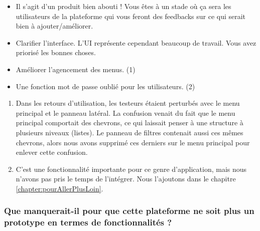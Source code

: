 \begin{itemize}
    \item Il s'agit d'un produit bien abouti ! Vous êtes à un stade où ça sera les utilisateurs de la plateforme qui vous feront des feedbacks sur ce qui serait bien à ajouter/améliorer.
    \item Clarifier l'interface. L'UI représente cependant beaucoup de travail. Vous avez priorisé les bonnes choses.
    \item Améliorer l'agencement des menus. (1)
    \item Une fonction mot de passe oublié pour les utilisateurs. (2)
\end{itemize}
\bigskip
\begin{enumerate}
    \item Dans les retours d'utilisation, les testeurs étaient perturbés avec le menu principal et le panneau latéral. La confusion venait du fait que le menu principal comportait des chevrons, ce qui laissait penser à une structure à plusieurs niveaux (listes). Le panneau de filtres contenait aussi ces mêmes chevrons, alors nous avons supprimé ces derniers sur le menu principal pour enlever cette confusion.
    \item C'est une fonctionnalité importante pour ce genre d'application, mais nous n'avons pas pris le temps de l'intégrer. Nous l'ajoutons dans le chapitre \ref{chapter:pourAllerPlusLoin}.
\end{enumerate}

\subsubsection*{Que manquerait-il pour que cette plateforme ne soit plus un prototype en termes de fonctionnalités ?}

